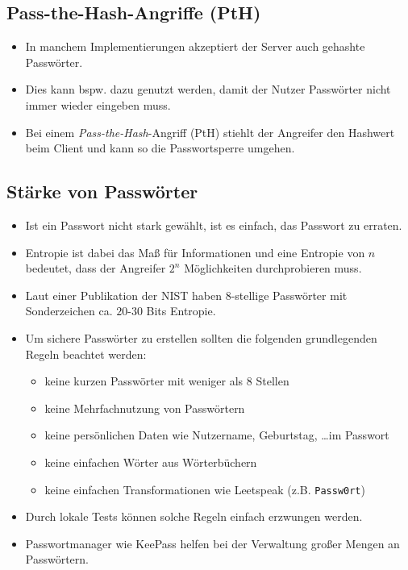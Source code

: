        \subsection{Pass-the-Hash-Angriffe (PtH)}
            \begin{itemize}
            	\item In manchem Implementierungen akzeptiert der Server auch gehashte Passwörter.
            	\item Dies kann bspw. dazu genutzt werden, damit der Nutzer Passwörter nicht immer wieder eingeben muss.
            	\item Bei einem \textit{Pass-the-Hash}-Angriff (PtH) stiehlt der Angreifer den Hashwert beim Client und kann so die Passwortsperre umgehen.
            \end{itemize}

        \subsection{Stärke von Passwörter}
            \begin{itemize}
            	\item Ist ein Passwort nicht stark gewählt, ist es einfach, das Passwort zu erraten.
            	\item Entropie ist dabei das Maß für Informationen und eine Entropie von \(n\) bedeutet, dass der Angreifer \(2^n\) Möglichkeiten durchprobieren muss.
            	\item Laut einer Publikation der NIST haben 8-stellige Passwörter mit Sonderzeichen ca. \(20\)-\(30\) Bits Entropie.
            	\item Um sichere Passwörter zu erstellen sollten die folgenden grundlegenden Regeln beachtet werden:
                	\begin{itemize}
                		\item keine kurzen Passwörter mit weniger als 8 Stellen
                		\item keine Mehrfachnutzung von Passwörtern
                		\item keine persönlichen Daten wie Nutzername, Geburtstag, \dots im Passwort
                		\item keine einfachen Wörter aus Wörterbüchern
                		\item keine einfachen Transformationen wie Leetspeak (z.B. \texttt{Passw0rt})
                	\end{itemize}
            	\item Durch lokale Tests können solche Regeln einfach erzwungen werden.
            	\item Passwortmanager wie KeePass helfen bei der Verwaltung großer Mengen an Passwörtern.
            \end{itemize}


